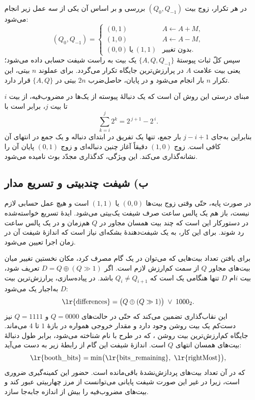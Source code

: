 \documentclass[12pt,a4paper]{article}
\begin{document}
	در هر تکرار، زوج بیت \((Q_0,Q_{-1})\) بررسی و بر اساس آن یکی از سه عمل زیر انجام می‌شود:
	\[
	(Q_0,Q_{-1})=
	\begin{cases}
	(0,1) & A \leftarrow A + M,\\
	(1,0) & A \leftarrow A - M,\\
	(0,0)\ \text{یا}\ (1,1) & \text{بدون تغییر.}
	\end{cases}
	\]
	سپس کلّ ثبات پیوستهٔ \(\{A,Q,Q_{-1}\}\) یک بیت به راست شیفت حسابی داده می‌شود؛ یعنی بیت علامت \(A\) در پرارزش‌ترین جایگاه تکرار می‌گردد. برای عملوند \(n\) بیتی، این تکرار \(n\) بار انجام می‌شود و در پایان، حاصل‌ضرب \(2n\) بیتی در \(\{A,Q\}\) قرار دارد.

	مبنای درستی این روش آن است که یک دنبالهٔ پیوسته از یک‌ها در مضروب‌فیه، از بیت \(i\) تا بیت \(j\)، برابر است با
	\[
	\sum_{k=i}^{j} 2^{k} = 2^{\,j+1}-2^{\,i}.
	\]
	بنابراین به‌جای \(j-i+1\) بار جمع، تنها یک تفریق در ابتدای دنباله و یک جمع در انتهای آن کافی است. زوج \((1,0)\) دقیقاً آغاز چنین دنباله‌ای و زوج \((0,1)\) پایان آن را نشانه‌گذاری می‌کند. این ویژگی، کدگذاری مجدّد بوث نامیده می‌شود.

	\subsection*{ب) شیفت چندبیتی و تسریع مدار}
	در صورت پایه، حتّی وقتی زوج بیت‌ها \((0,0)\) یا \((1,1)\) است و هیچ عمل حسابی لازم نیست، باز هم یک پالس ساعت صرف شیفت یک‌بیتی می‌شود. ایدهٔ تسریع خواسته‌شده در دستورکار این است که چند بیت همسان مجاور در \(Q\) هم‌زمان و در یک پالس ساعت رد شوند. برای این کار، به یک شیفت‌دهندهٔ بشکه‌ای نیاز است که اندازهٔ شیفت آن در زمان اجرا تعیین می‌شود.

	برای یافتن تعداد بیت‌هایی که می‌توان در یک گام مصرف کرد، مکان نخستین تغییر میان بیت‌های مجاور \(Q\) از سمت کم‌ارزش لازم است. اگر \(D=Q\oplus(Q\gg1)\) تعریف شود، بیت \(i\)ام \(D\) تنها هنگامی یک است که \(Q_i\neq Q_{i+1}\) باشد. در پیاده‌سازی، پرارزش‌ترین بیت \(D\) به‌اجبار یک می‌شود:
	\[
	\text{\lr{differences}} = \bigl(Q \oplus (Q\gg1)\bigr) \;\lor\; 1000_2 .
	\]
	این نقاب‌گذاری تضمین می‌کند که حتّی در حالت‌های \(Q=0000\) و \(Q=1111\) نیز دست‌کم یک بیت روشن وجود دارد و مقدار خروجی همواره در بازهٔ \(1\) تا \(4\) می‌ماند. جایگاه کم‌ارزش‌ترین بیت روشن ، که در طرح با نام  شناخته می‌شود، برابر طول دنبالهٔ بیت‌های همسان انتهای \(Q\) است. اندازهٔ شیفت این گام از رابطهٔ زیر به دست می‌آید:
	\[
	\text{\lr{booth\_bits}} = \min\bigl(\text{\lr{bits\_remaining}},\ \text{\lr{rightMost}}\bigr),
	\]
	که در آن  تعداد بیت‌های پردازش‌نشدهٔ باقی‌مانده است. حضور این کمینه‌گیری ضروری است، زیرا در غیر این صورت شیفت پایانی می‌توانست از مرز چهاربیتی عبور کند و بیت‌های مضروب‌فیه را بیش از اندازه جابه‌جا سازد.
\end{document}
